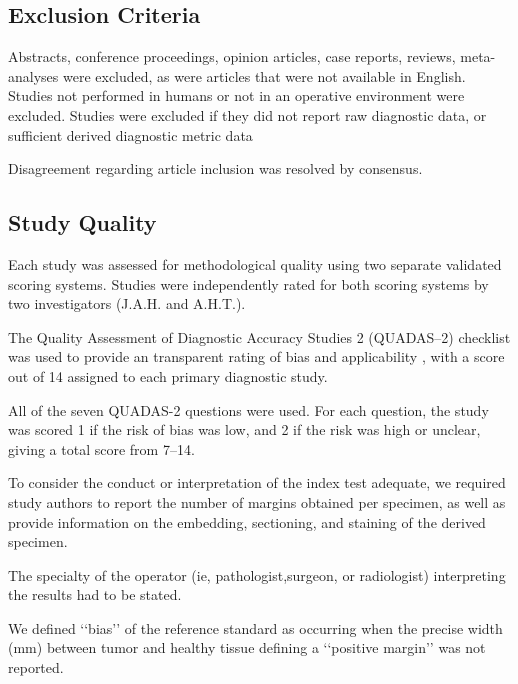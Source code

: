 \subsection{Exclusion Criteria}

Abstracts, conference proceedings, opinion articles, case reports, reviews, meta-analyses were excluded, as were articles that were not available in English.
Studies not performed in humans or not in an operative environment were excluded. 
Studies were excluded if they did not report raw diagnostic data, or sufficient derived diagnostic metric data 

Disagreement regarding article inclusion was resolved by consensus.

\subsection{Study Quality}

Each study was assessed for methodological quality using two separate validated scoring systems.
Studies were independently rated for both scoring systems by two investigators (J.A.H. and A.H.T.).

The Quality Assessment of Diagnostic Accuracy Studies 2 (QUADAS--2) checklist was used to provide an transparent rating of bias and applicability \cite{whitingQUADAS2RevisedTool2011}, with a score out of 14 assigned to each primary diagnostic study.

All of the seven QUADAS-2 questions were used.
For each question, the study was scored 1 if the risk of bias was low, and 2 if the risk was high or unclear, giving a total score from 7--14.







To consider the conduct or interpretation of the index test adequate, we required study authors to report the number of margins obtained per specimen, as well as provide information on the embedding, sectioning, and staining of the derived specimen. 

The specialty of the operator (ie, pathologist,surgeon, or radiologist) interpreting the results had to be stated. 

We defined ‘‘bias’’ of the reference standard as occurring when the precise width (mm) between tumor and healthy tissue defining a ‘‘positive margin’’ was not reported. 

